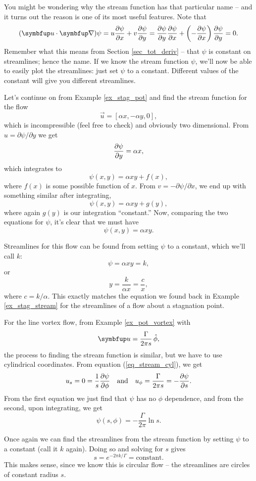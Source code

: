 You might be wondering why the stream function has that particular name -- and it turns out the reason is one of its most useful features.  Note that
\[
(\vec{u} \cdot \grad ) \psi = u\dfdx{\psi}{x} + v\dfdx{\psi}{y} = \dfdx{\psi}{y} \dfdx{\psi}{x} + \left( -\dfdx{\psi}{x} \right) \dfdx{\psi}{y} = 0.
\]
Remember what this means from Section \ref{sec_tot_deriv} -- that $\psi$ is constant on streamlines; hence the name.  If we know the stream function $\psi$, we'll now be able to easily plot the streamlines:  just set $\psi$ to a constant.  Different values of the constant will give you different streamlines.


\begin{example}
\label{ex_stag_psi}
Let's continue on from Example \ref{ex_stag_pot} and find the stream function for the flow
\[
\vec{u} = [\alpha x, -\alpha y, 0],
\]
which is incompressible (feel free to check) and obviously two dimensional.  From $u = \partial \psi / \partial y$ we get
\[
\frac{\partial {\psi}}{\partial {y}} = \alpha x,
\]
which integrates to 
\[
\psi(x, y) = \alpha x y + f(x),
\]
where $f(x)$ is some possible function of $x$.  From $v = -\partial \psi / \partial x$, we end up with something similar after integrating,
\[
\psi(x, y) = \alpha x y + g(y),
\]
where again $g(y)$ is our integration ``constant.''  Now, comparing the two equations for $\psi$, it's clear that we must have
\begin{equation}
\psi(x, y) = \alpha x y.
\end{equation}

Streamlines for this flow can be found from setting $\psi$ to a constant, which we'll call $k$:
\[
\psi = \alpha x y = k,
\]
or
\[
y = \frac{k}{\alpha x} = \frac{c}{x},
\]
where $c = k/\alpha$.  This exactly matches the equation we found back in Example \ref{ex_stag_stream} for the streamlines of a flow about a stagnation point.
\end{example}



\begin{example}
\label{ex_vortex_psi}
For the line vortex flow, from Example \ref{ex_pot_vortex} with
\[
\uu = \frac{\Gamma}{2\pi s} \, \hat{\phi},
\]
the process to finding the stream function is similar, but we have to use cylindrical coordinates.  From equation (\ref{eq_stream_cyl}), we get
\[
u_s = 0 = \frac{1}{s} \frac{\partial {\psi}}{\partial {\phi}} \quad \text{and} \quad u_\phi = \frac{\Gamma}{2\pi s} = -\frac{\partial {\psi}}{\partial {s}}.
\]
From the first equation we just find that $\psi$ has no $\phi$ dependence, and from the second, upon integrating, we get
\[
\psi(s, \phi) = -\frac{\Gamma}{2\pi} \ln s.
\]

Once again we can find the streamlines from the stream function by setting $\psi$ to a constant (call it $k$ again).  Doing so and solving for $s$ gives
\[
s = e^{-2\pi k / \Gamma} = \text{constant}.
\]
This makes sense, since we know this is circular flow -- the streamlines are circles of constant radius $s$.
\end{example}

